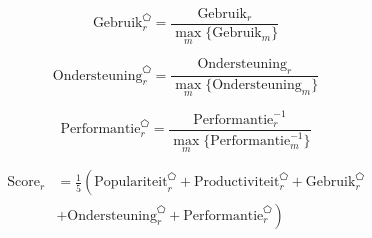 \begin{equation}
  \text{Gebruik}_r^{\pentagon} = \frac{\text{Gebruik}_r}{\underset{m}{\max}\{\text{Gebruik}_m\}}
  \label{eq:rel-gebruik}
\end{equation}

\begin{equation}
  \text{Ondersteuning}_r^{\pentagon} = \frac{\text{Ondersteuning}_r}{\underset{m}{\max}\{\text{Ondersteuning}_m\}}
  \label{eq:rel-ondersteuning}
\end{equation}

\begin{equation}
  \text{Performantie}_r^{\pentagon}= \frac{\text{Performantie}_r^{-1}}{\underset{m}{\max}\{\text{Performantie}_m^{-1}\}}
  \label{eq:rel-performantie}
\end{equation}

\begin{equation}
\begin{split}
  \text{Score}_r &= \frac{1}{5} \left( \text{Populariteit}_r^{\pentagon}
  + \text{Productiviteit}_r^{\pentagon} 
  + \text{Gebruik}_r^{\pentagon} \right. \\
  &+ \left. \text{Ondersteuning}_r^{\pentagon}
  + \text{Performantie}_r^{\pentagon} \right)
  \end{split}
  \label{eq:rel-totaal}
\end{equation}
